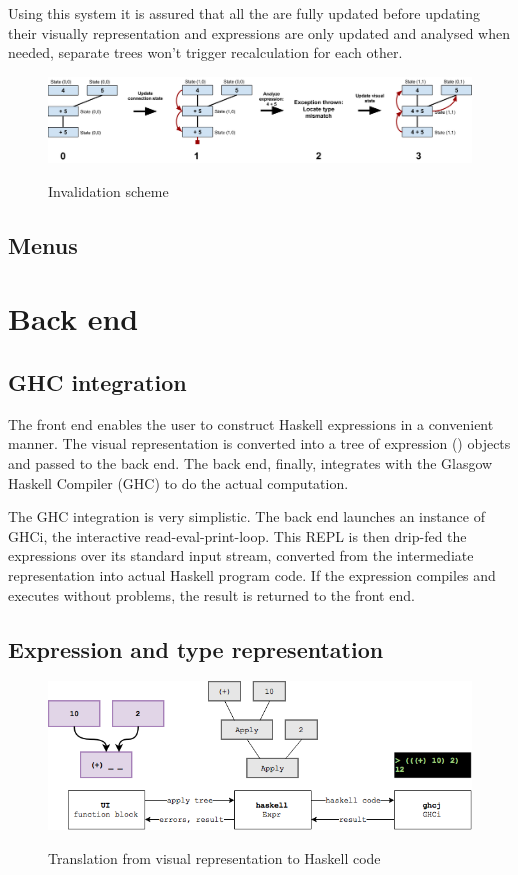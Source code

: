 Using this system it is assured that all the  are fully updated before updating their visually representation and expressions are only updated and analysed when needed, separate trees won't trigger recalculation for each other.

\begin{figure}[h]
	\centering
	\includegraphics[scale=0.23]{Images/invalidation}
	\label{fig:invalidation}
	\caption{Invalidation scheme}
\end{figure}

\subsection{Menus}


\section{Back end}

\subsection{GHC integration}

The front end enables the user to construct Haskell expressions in a convenient manner.
The visual representation is converted into a tree of expression () objects and passed to the back end. 
The back end, finally, integrates with the Glasgow Haskell Compiler (\gls{GHC}) to do the actual computation.

The GHC integration is very simplistic.
The back end launches an instance of GHCi, the interactive read-eval-print-loop. 
This \gls{REPL} is then drip-fed the expressions over its standard input stream, converted from the intermediate representation into actual Haskell program code.
If the expression compiles and executes without problems, the result is returned to the front end.

\subsection{Expression and type representation}

\begin{figure}[h]
	\centering
	\includegraphics[scale=0.5]{Images/exprtohaskell}
	\label{fig:classdiagram-expr}
	\caption{Translation from visual representation to Haskell code}
\end{figure}

